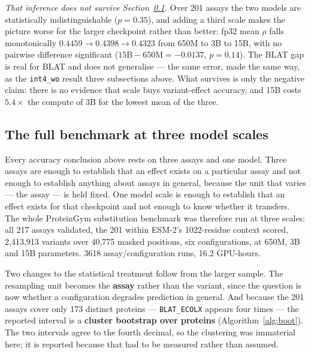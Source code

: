 \documentclass[11pt]{article}
\newcommand{\cfg}[1]{\texttt{#1}}
\begin{document}
\emph{That inference does not survive Section~\ref{sec:full}.} Over 201 assays
the two models are statistically indistinguishable ($p = 0.35$), and adding a
third scale makes the picture worse for the larger checkpoint rather than
better: fp32 mean $\rho$ falls monotonically $0.4459 \to 0.4398 \to 0.4323$ from
650M to 3B to 15B, with no pairwise difference significant
($15\text{B}-650\text{M} = -0.0137$, $p = 0.14$). The BLAT gap is real for BLAT
and does not generalise --- the same error, made the same way, as the
\cfg{int4\_wo} result three subsections above. What survives is only the
negative claim: there is no evidence that scale buys variant-effect accuracy,
and 15B costs $5.4\times$ the compute of 3B for the lowest mean of the three.

\subsection{The full benchmark at three model scales}
\label{sec:full}

Every accuracy conclusion above rests on three assays and one model. Three
assays are enough to establish that an effect exists on a particular assay and
not enough to establish anything about assays in general, because the unit that
varies --- the assay --- is held fixed. One model scale is enough to establish
that an effect exists for that checkpoint and not enough to know whether it
transfers. The whole ProteinGym substitution benchmark was therefore run at
three scales: all 217 assays validated, the 201 within ESM-2's 1022-residue
context scored, 2{,}413{,}913 variants over 40{,}775 masked positions, six
configurations, at 650M, 3B and 15B parameters. 3618 assay/configuration runs,
16.2 GPU-hours.

Two changes to the statistical treatment follow from the larger sample. The
resampling unit becomes the \textbf{assay} rather than the variant, since the
question is now whether a configuration degrades prediction in general. And
because the 201 assays cover only 173 distinct proteins ---
\texttt{BLAT\_ECOLX} appears four times --- the reported interval is a
\textbf{cluster bootstrap over proteins} (Algorithm~\ref{alg:boot}). The two
intervals agree to the fourth decimal, so the clustering was immaterial here;
it is reported because that had to be measured rather than assumed.
\end{document}
